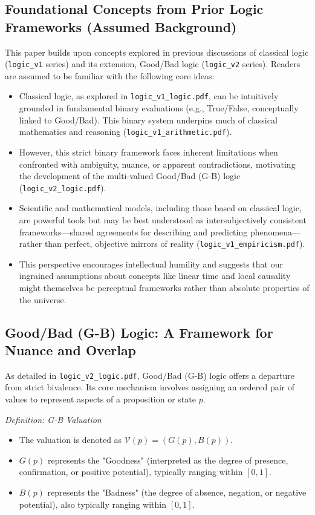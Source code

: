 \documentclass{article}
\begin{document}
\subsection{Foundational Concepts from Prior Logic Frameworks (Assumed Background)}

This paper builds upon concepts explored in previous discussions of classical logic (\texttt{logic\_v1} series) and its extension, Good/Bad logic (\texttt{logic\_v2} series). Readers are assumed to be familiar with the following core ideas:
\begin{itemize}
    \item Classical logic, as explored in \texttt{logic\_v1\_logic.pdf}, can be intuitively grounded in fundamental binary evaluations (e.g., True/False, conceptually linked to Good/Bad). This binary system underpins much of classical mathematics and reasoning (\texttt{logic\_v1\_arithmetic.pdf}).
    \item However, this strict binary framework faces inherent limitations when confronted with ambiguity, nuance, or apparent contradictions, motivating the development of the multi-valued Good/Bad (G-B) logic (\texttt{logic\_v2\_logic.pdf}).
    \item Scientific and mathematical models, including those based on classical logic, are powerful tools but may be best understood as intersubjectively consistent frameworks---shared agreements for describing and predicting phenomena---rather than perfect, objective mirrors of reality (\texttt{logic\_v1\_empiricism.pdf}).
    \item This perspective encourages intellectual humility and suggests that our ingrained assumptions about concepts like linear time and local causality might themselves be perceptual frameworks rather than absolute properties of the universe.
\end{itemize}

\subsection{Good/Bad (G-B) Logic: A Framework for Nuance and Overlap}

As detailed in \texttt{logic\_v2\_logic.pdf}, Good/Bad (G-B) logic offers a departure from strict bivalence. Its core mechanism involves assigning an ordered pair of values to represent aspects of a proposition or state $p$.

\vspace{\baselineskip} %
\noindent\textit{Definition: G-B Valuation}
\begin{itemize}
    \item The valuation is denoted as $\mathcal{V}(p) = (G(p), B(p))$.
    \item $G(p)$ represents the "Goodness" (interpreted as the degree of presence, confirmation, or positive potential), typically ranging within $[0, 1]$.
    \item $B(p)$ represents the "Badness" (the degree of absence, negation, or negative potential), also typically ranging within $[0, 1]$.
\end{itemize}
\vspace{\baselineskip} %
\end{document}
